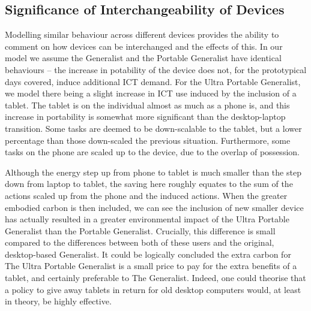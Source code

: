 \documentclass[conference]{IEEEtran}
\begin{document}
\subsection{Significance of Interchangeability of Devices}

Modelling similar behaviour across different devices provides the
ability to comment on how devices can be interchanged and the effects
of this. In our model we assume the Generalist and the Portable
Generalist have identical behaviours -- the increase in potability of
the device does not, for the prototypical days covered, induce
additional ICT demand. For the Ultra Portable Generalist, we model
there being a slight increase in ICT use induced by the inclusion of a
tablet. The tablet is on the individual almost as much as a phone is,
and this increase in portability is somewhat more significant than the
desktop-laptop transition. Some tasks are deemed to be down-scalable
to the tablet, but a lower percentage than those down-scaled the
previous situation. Furthermore, some tasks on the phone are scaled up
to the device, due to the overlap of possession.



Although the energy step up from phone to tablet is much smaller than
the step down from laptop to tablet, the saving here roughly equates
to the sum of the actions scaled up from the phone and the induced
actions. When the greater embodied carbon is then included, we can see
the inclusion of new smaller device has actually resulted in a greater
environmental impact of the Ultra Portable Generalist than the
Portable Generalist. Crucially, this difference is small compared to
the differences between both of these users and the original,
desktop-based Generalist. It could be logically concluded the extra
carbon for The Ultra Portable Generalist is a small price to pay for
the extra benefits of a tablet, and certainly preferable to The
Generalist. Indeed, one could theorise that a policy to give away
tablets in return for old desktop computers would, at least in theory,
be highly effective.
\end{document}
